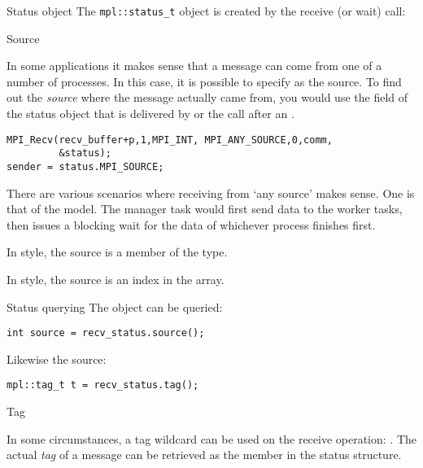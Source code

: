 \begin{mplnote}{Status object}
  The \lstinline+mpl::status_t+ object is created by the receive
  (or wait) call:
\end{mplnote}

 {Source}
\label{sec:mpi-source}

In some applications it makes sense that a message can come from 
one of a number of processes. In this case, it is possible to specify
 as the source.
%
To find out the \emph{source}
where the message actually came from,
you would use the  field of the status object
that is delivered by 
or the  call after an .
\begin{lstlisting}
MPI_Recv(recv_buffer+p,1,MPI_INT, MPI_ANY_SOURCE,0,comm,
         &status);
sender = status.MPI_SOURCE;
\end{lstlisting}

There are various scenarios where receiving from `any source' makes sense.
One is that of the  model. The manager task would first send
data to the worker tasks, then issues a blocking wait for the data of whichever process
finishes first.

In  style, the source is a member of the  type.


In  style, the source is an index in the  array.


\begin{mplnote}{Status querying}
The  object can be queried:
\begin{lstlisting}
int source = recv_status.source();
\end{lstlisting}
Likewise the source:
\begin{lstlisting}
mpl::tag_t t = recv_status.tag();
\end{lstlisting}

\end{mplnote}

 {Tag}
\label{sec:mpi-tag}

In some circumstances, a tag wildcard can be used on the receive operation:
.
The actual
\emph{tag}
of a message can be retrieved as the
%
%
member in the status structure.

